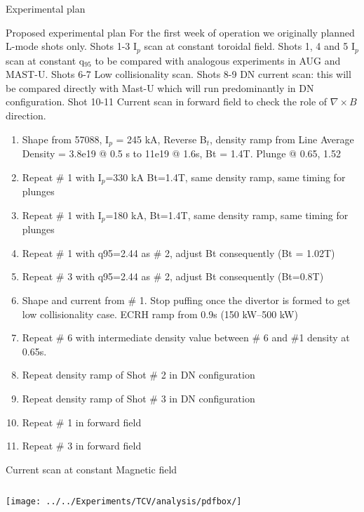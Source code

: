 \documentclass[10pt, compress]{beamer}
\newcommand\Fontvi{\fontsize{8}{7.2}\selectfont}
\begin{document}
\begin{frame}{Experimental plan}
  \begin{frame}{Proposed experimental plan}
\Fontvi
    \alert{For the first week of operation we originally planned L-mode shots
      only. Shots 1-3 I$_p$ scan at constant toroidal field. Shots
      1, 4 and 5 I$_p$ scan at constant q$_{95}$ to be compared with
      analogous experiments in AUG and MAST-U. Shots 6-7 Low
      collisionality scan. Shots 8-9 DN current scan: this will be
      compared directly with Mast-U which will run predominantly in DN
    configuration. Shot 10-11 Current scan in forward field to check
    the role of $\nabla\times B$ direction.}
\begin{enumerate}
\item Shape from 57088, I$_p$ = 245 kA,  Reverse B$_t$,
    density ramp from Line Average Density = 3.8e19 @ 0.5 s to 11e19 @ 1.6s,  Bt = 1.4T. Plunge @ 0.65, 1.52
\item  Repeat \# 1 with I$_p$=330 kA Bt=1.4T, same density ramp, same timing for plunges
\item  Repeat \# 1 with I$_p$=180 kA, Bt=1.4T, same density ramp, same timing for plunges
\item  Repeat \# 1 with q95=2.44 as \# 2, adjust Bt consequently (Bt = 1.02T)
\item  Repeat \# 3 with q95=2.44 as \# 2, adjust Bt consequently (Bt=0.8T)
\item  Shape and current from \# 1. Stop puffing once the divertor is
  formed to get low collisionality case. ECRH ramp from 0.9s (150
  kW--500 kW)
\item  Repeat \# 6 with intermediate density value between \# 6 and
  \#1 density at 0.65s. 
\item  Repeat density ramp of Shot \# 2 in DN configuration 
\item  Repeat density ramp of Shot \# 3 in DN configuration 
\item Repeat \# 1 in forward field
\item Repeat \# 3 in forward field
\end{enumerate}
\end{frame}

\begin{frame}{Current scan at constant Magnetic field}
  \begin{columns}[c]
    \begin{column}{0.65\textwidth}
      \texttt{[image: ../../Experiments/TCV/analysis/pdfbox/]}
    \end{column}
  \end{columns}
  


\end{frame}
\end{frame}
\end{document}
